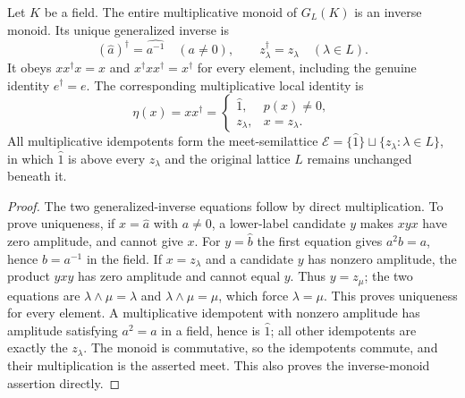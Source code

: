 \begin{theorem}
\label{sh:inversemonoid}
Let $K$ be a field. The entire multiplicative monoid of $G_L(K)$
is an inverse monoid. Its unique generalized inverse is
\begin{equation}\tag{SH6a}\label{sh:generalizedinverse}
 (\widehat a)^\dagger=\widehat{a^{-1}}\quad(a\ne0),\qquad
 z_\lambda^\dagger=z_\lambda\quad(\lambda\in L).
\end{equation}
It obeys $xx^\dagger x=x$ and
$x^\dagger xx^\dagger=x^\dagger$ for every element,
including the genuine identity $e^\dagger=e$.
The corresponding multiplicative local identity is
\begin{equation}\tag{SH6b}\label{sh:rangeidempotent}
 \eta(x)=xx^\dagger=
 \begin{cases}
 \widehat1,&p(x)\ne0,\\
 z_\lambda,&x=z_\lambda.
 \end{cases}
\end{equation}
All multiplicative idempotents form the meet-semilattice
$\mathcal E=\{\widehat1\}\sqcup\{z_\lambda:\lambda\in L\}$,
in which $\widehat1$ is above every $z_\lambda$ and the
original lattice $L$ remains unchanged beneath it.
\end{theorem}
\begin{proof}
The two generalized-inverse equations follow by direct
multiplication. To prove uniqueness, if $x=\widehat a$ with
$a\ne0$, a lower-label candidate $y$ makes $xyx$ have zero
amplitude, and cannot give $x$. For $y=\widehat b$ the first
equation gives $a^2b=a$, hence $b=a^{-1}$ in the field.
If $x=z_\lambda$ and a candidate $y$ has nonzero amplitude,
the product $yxy$ has zero amplitude and cannot equal $y$.
Thus $y=z_\mu$; the two equations are
$\lambda\wedge\mu=\lambda$ and
$\lambda\wedge\mu=\mu$, which force $\lambda=\mu$.
This proves uniqueness for every element. A multiplicative
idempotent with nonzero amplitude has amplitude satisfying
$a^2=a$ in a field, hence is $\widehat1$; all other
idempotents are exactly the $z_\lambda$.
The monoid is commutative, so the idempotents commute, and
their multiplication is the asserted meet. This also proves
the inverse-monoid assertion directly.
\end{proof}

